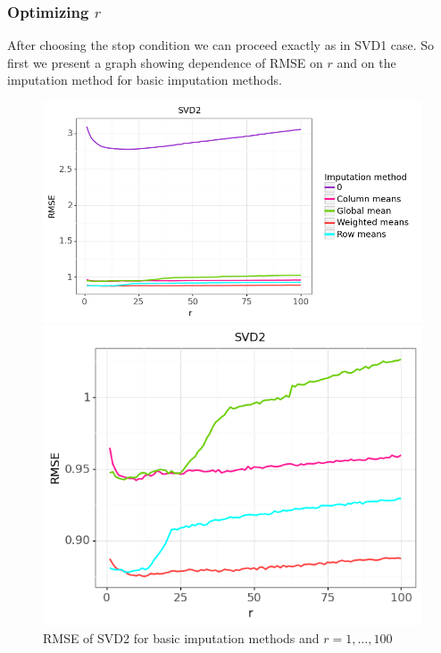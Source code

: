 \documentclass[11pt]{amsart}
\begin{document}
\subsubsection*{Optimizing $r$}
After choosing the stop condition we can proceed exactly as in SVD1 case.
So first we present a graph showing dependence of RMSE on $r$ and on the imputation method for basic imputation methods.
\begin{figure}[H]
\centering
\begin{minipage}{.63\textwidth}
  \centering
  \includegraphics[width=\textwidth]{svd2_1}
\end{minipage}%
\begin{minipage}{.4\textwidth}
  \centering
  \includegraphics[width=\textwidth]{svd2_2}
\end{minipage}
\caption{RMSE of SVD2 for basic imputation methods and $r = 1, \dots, 100$}
\end{figure}
\end{document}
